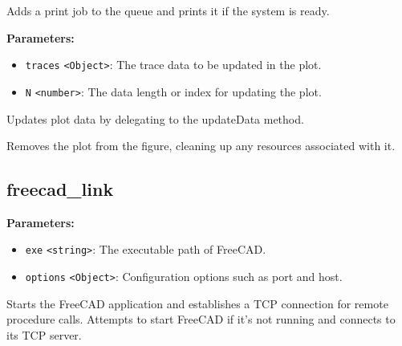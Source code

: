 \documentclass[12pt,a4paper]{article}
\begin{document}
\noindent Adds a print job to the queue and prints it if the system is ready.

\vspace{5mm}
\noindent {}


\noindent \textbf{Parameters:}
\begin{itemize}
  \item \texttt{traces} \texttt{<Object>}: The trace data to be updated in the plot.
  \item \texttt{N} \texttt{<number>}: The data length or index for updating the plot.
\end{itemize}

\noindent Updates plot data by delegating to the \textasciigrave{}updateData\textasciigrave{} method.

\vspace{5mm}
\noindent {}


\noindent Removes the plot from the figure, cleaning up any resources associated with it.


\subsection{freecad\_link}
\vspace{5mm}
\noindent {}


\noindent \textbf{Parameters:}
\begin{itemize}
  \item \texttt{exe} \texttt{<string>}: The executable path of FreeCAD.
  \item \texttt{options} \texttt{<Object>}: Configuration options such as port and host.
\end{itemize}

\noindent Starts the FreeCAD application and establishes a TCP connection for remote procedure calls.
Attempts to start FreeCAD if it's not running and connects to its TCP server.

\vspace{5mm}
\noindent {}
\end{document}
